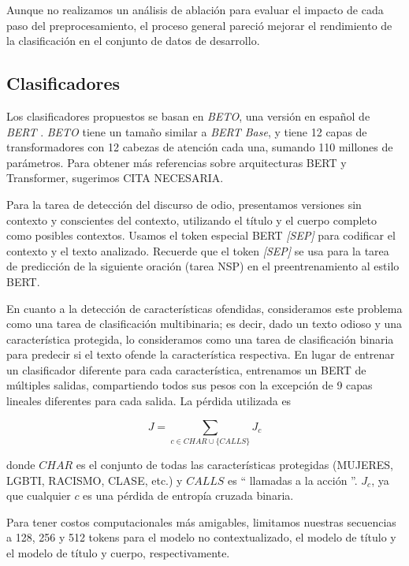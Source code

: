 Aunque no realizamos un análisis de ablación para evaluar el impacto de cada paso del preprocesamiento, el proceso general pareció mejorar el rendimiento de la clasificación en el conjunto de datos de desarrollo.

\subsection{Clasificadores}

Los clasificadores propuestos se basan en \emph{BETO}\cite{canete2020spanish}, una versión en español de \emph{BERT} \cite{devlin2018bert}. \emph{BETO} tiene un tamaño similar a \emph {BERT Base}, y tiene 12 capas de transformadores con 12 cabezas de atención cada una, sumando 110 millones de parámetros. Para obtener más referencias sobre arquitecturas BERT y Transformer, sugerimos CITA NECESARIA.

Para la tarea de detección del discurso de odio, presentamos versiones sin contexto y conscientes del contexto, utilizando el título y el cuerpo completo como posibles contextos. Usamos el token especial BERT \emph {[SEP]} para codificar el contexto y el texto analizado. Recuerde que el token \emph {[SEP]} se usa para la tarea de predicción de la siguiente oración (tarea NSP) en el preentrenamiento al estilo BERT.

En cuanto a la detección de características ofendidas, consideramos este problema como una tarea de clasificación multibinaria; es decir, dado un texto odioso y una característica protegida, lo consideramos como una tarea de clasificación binaria para predecir si el texto ofende la característica respectiva. En lugar de entrenar un clasificador diferente para cada característica, entrenamos un BERT de múltiples salidas, compartiendo todos sus pesos con la excepción de 9 capas lineales diferentes para cada salida. La pérdida utilizada es

\begin{equation*}
    J = \sum\limits_{c \in CHAR \cup \{CALLS\}} J_c
\end{equation*}

donde $CHAR$ es el conjunto de todas las características protegidas (MUJERES, LGBTI, RACISMO, CLASE, etc.) y $CALLS$ es `` llamadas a la acción ''. $ J_c $, ya que cualquier $ c $ es una pérdida de entropía cruzada binaria.

Para tener costos computacionales más amigables, limitamos nuestras secuencias a 128, 256 y 512 tokens para el modelo no contextualizado, el modelo de título y el modelo de título y cuerpo, respectivamente.


